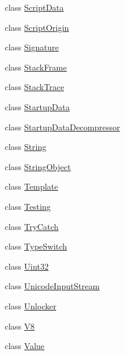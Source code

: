 \begin{DoxyCompactItemize}
\item 
class \hyperlink{classv8_1_1_script_data}{Script\+Data}
\item 
class \hyperlink{classv8_1_1_script_origin}{Script\+Origin}
\item 
class \hyperlink{classv8_1_1_signature}{Signature}
\item 
class \hyperlink{classv8_1_1_stack_frame}{Stack\+Frame}
\item 
class \hyperlink{classv8_1_1_stack_trace}{Stack\+Trace}
\item 
class \hyperlink{classv8_1_1_startup_data}{Startup\+Data}
\item 
class \hyperlink{classv8_1_1_startup_data_decompressor}{Startup\+Data\+Decompressor}
\item 
class \hyperlink{classv8_1_1_string}{String}
\item 
class \hyperlink{classv8_1_1_string_object}{String\+Object}
\item 
class \hyperlink{classv8_1_1_template}{Template}
\item 
class \hyperlink{classv8_1_1_testing}{Testing}
\item 
class \hyperlink{classv8_1_1_try_catch}{Try\+Catch}
\item 
class \hyperlink{classv8_1_1_type_switch}{Type\+Switch}
\item 
class \hyperlink{classv8_1_1_uint32}{Uint32}
\item 
class \hyperlink{classv8_1_1_unicode_input_stream}{Unicode\+Input\+Stream}
\item 
class \hyperlink{classv8_1_1_unlocker}{Unlocker}
\item 
class \hyperlink{classv8_1_1_v8}{V8}
\item 
class \hyperlink{classv8_1_1_value}{Value}
\end{DoxyCompactItemize}
